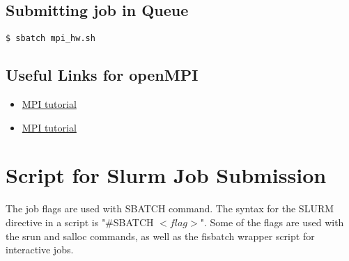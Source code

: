 \documentclass[11pt]{article}
\numberwithin{figure}{section}
\begin{document}
\subsection{Submitting job in Queue}

\begin{lstlisting}[frame=single]
$ sbatch mpi_hw.sh
\end{lstlisting}

\subsection{Useful Links for openMPI}

\begin{itemize}
    \item \href{https://www.google.com/url?sa=t&rct=j&q=&esrc=s&source=web&cd=1&cad=rja&uact=8&ved=0ahUKEwiC3oqOga_aAhXCvY8KHXJYCqwQFggnMAA&url=http%3A%2F%2Fmpitutorial.com%2Ftutorials%2F&usg=AOvVaw3gcXG-8XhYsVPu5egCZ2EP} {MPI tutorial}

\item \href{http://mpitutorial.com/tutorials/mpi-hello-world/}{MPI tutorial}
\end{itemize}

\section{Script for Slurm Job Submission}
The job flags are used with SBATCH command.  The syntax for the SLURM directive
in a script is  "\#SBATCH $<flag>$".  Some of the flags are used with the srun and
salloc commands, as well as the fisbatch wrapper script for interactive jobs.
\end{document}
